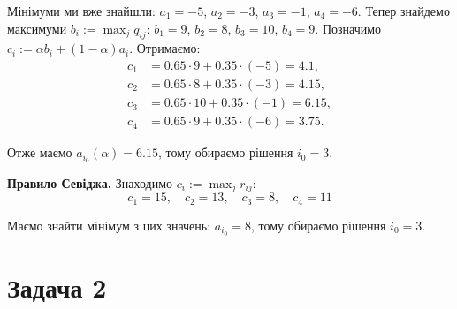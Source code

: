 \documentclass{hw_template}
\begin{document}
Мінімуми ми вже знайшли: $a_1=-5$, $a_2=-3$, $a_3=-1$, $a_4=-6$. Тепер знайдемо
максимуми $b_i := \max_j q_{ij}$: $b_1=9$, $b_2=8$, $b_3=10$, $b_4=9$. Позначимо 
$c_i := \alpha b_i + (1-\alpha)a_i$. Отримаємо:
\begin{align*}
    c_1 &= 0.65 \cdot 9 + 0.35 \cdot (-5) = 4.1, \\
    c_2 &= 0.65 \cdot 8 + 0.35 \cdot (-3) = 4.15, \\
    c_3 &= 0.65 \cdot 10 + 0.35 \cdot (-1) = 6.15, \\
    c_4 &= 0.65 \cdot 9 + 0.35 \cdot (-6) = 3.75.
\end{align*}

Отже маємо $a_{i_0}(\alpha) = 6.15$, тому обираємо рішення $i_0=3$.

\textbf{Правило Севіджа.} Знаходимо $c_i := \max_j r_{ij}$:
\begin{equation*}
    c_1 = 15, \quad c_2 = 13, \quad c_3 = 8, \quad c_4 = 11
\end{equation*}

Маємо знайти мінімум з цих значень: $a_{i_0} = 8$, тому обираємо рішення $i_0=3$.

\section{Задача 2}
\end{document}
